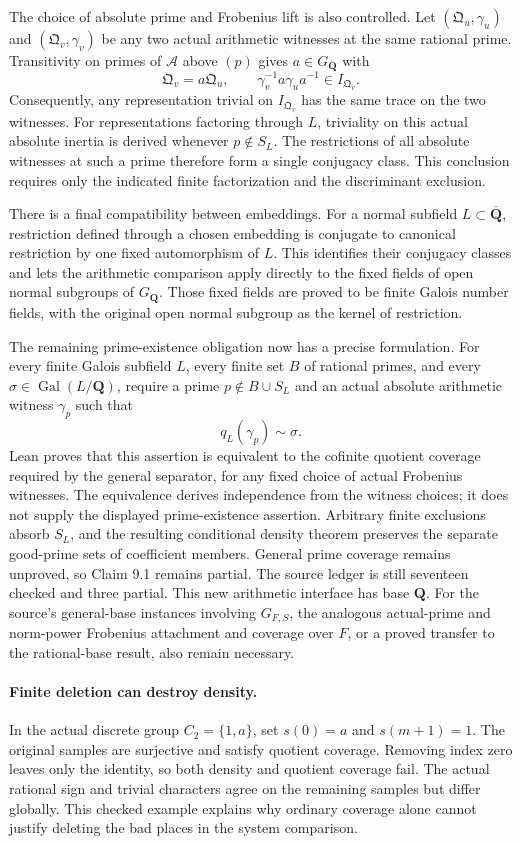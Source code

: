\documentclass[11pt]{article}
\theoremstyle{definition}
\theoremstyle{remark}
\newcommand{\Q}{\mathbf Q}
\begin{document}
The choice of absolute prime and Frobenius lift is also controlled. Let
$(\mathfrak Q_u,\gamma_u)$ and $(\mathfrak Q_v,\gamma_v)$ be any two
actual arithmetic witnesses at the same rational prime. Transitivity on
primes of $\mathcal A$ above $(p)$ gives $a\in G_{\Q}$ with
\[
 \mathfrak Q_v=a\mathfrak Q_u,\qquad
 \gamma_v^{-1}a\gamma_u a^{-1}\in I_{\mathfrak Q_v}.
\]
Consequently, any representation trivial on $I_{\mathfrak Q_v}$ has the
same trace on the two witnesses. For representations factoring through
$L$, triviality on this actual absolute inertia is derived whenever
$p\notin S_L$. The restrictions of all absolute witnesses at such a prime
therefore form a single conjugacy class. This conclusion requires only
the indicated finite factorization and the discriminant exclusion.

There is a final compatibility between embeddings. For a normal subfield
$L\subset\overline{\Q}$, restriction defined through a chosen embedding
is conjugate to canonical restriction by one fixed automorphism of $L$.
This identifies their conjugacy classes and lets the arithmetic comparison
apply directly to the fixed fields of open normal subgroups of $G_{\Q}$.
Those fixed fields are proved to be finite Galois number fields, with the
original open normal subgroup as the kernel of restriction.

The remaining prime-existence obligation now has a precise formulation.
For every finite Galois subfield $L$, every finite set $B$ of rational
primes, and every $\sigma\in\operatorname{Gal}(L/\Q)$, require a prime
$p\notin B\cup S_L$ and an actual absolute arithmetic witness $\gamma_p$
such that
\[
 q_L(\gamma_p)\sim\sigma.
\]
Lean proves that this assertion is equivalent to the cofinite quotient
coverage required by the general separator, for any fixed choice of actual
Frobenius witnesses. The equivalence derives independence from the witness
choices; it does not supply the displayed prime-existence assertion.
Arbitrary finite exclusions absorb $S_L$, and the resulting conditional
density theorem preserves the separate good-prime sets of coefficient
members. General prime coverage remains unproved, so Claim 9.1 remains
partial. The source ledger is still seventeen checked and three partial.
This new arithmetic interface has base $\Q$. For the source's general-base
instances involving $G_{F,S}$, the analogous actual-prime and norm-power
Frobenius attachment and coverage over $F$, or a proved transfer to the
rational-base result, also remain necessary.

\paragraph{Finite deletion can destroy density.}
In the actual discrete group $C_2=\{1,a\}$, set $s(0)=a$ and $s(m+1)=1$.
The original samples are surjective and satisfy quotient coverage. Removing
index zero leaves only the identity, so both density and quotient coverage fail.
The actual rational sign and trivial characters agree on the remaining samples
but differ globally. This checked example explains why ordinary coverage alone
cannot justify deleting the bad places in the system comparison.
\end{document}
